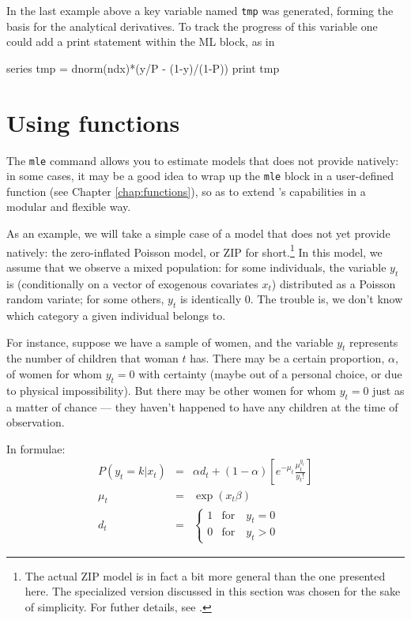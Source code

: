 In the last example above a key variable named \texttt{tmp} was
generated, forming the basis for the analytical derivatives.  To track
the progress of this variable one could add a print statement within
the ML block, as in
%
\begin{code}
series tmp = dnorm(ndx)*(y/P - (1-y)/(1-P))
print tmp
\end{code}

\section{Using functions}
\label{sec:mle-func}

The \texttt{mle} command allows you to estimate models that
 does not provide natively: in some cases, it may be a good
idea to wrap up the \texttt{mle} block in a user-defined function (see
Chapter \ref{chap:functions}), so as to extend 's
capabilities in a modular and flexible way.

As an example, we will take a simple case of a model that 
does not yet provide natively: the zero-inflated Poisson model, or ZIP
for short.\footnote{The actual ZIP model is in fact a bit more general
than the one presented here. The specialized version discussed in this
section was chosen for the sake of simplicity. For futher details, see
\cite{greene03}.} In this model, we assume that we observe a mixed
population: for some individuals, the variable $y_t$ is (conditionally
on a vector of exogenous covariates $x_t$) distributed as a Poisson
random variate; for some others, $y_t$ is identically 0. The trouble
is, we don't know which category a given individual belongs to.  

For instance, suppose we have a sample of women, and the variable $y_t$
represents the number of children that woman $t$ has. There may be a
certain proportion, $\alpha$, of women for whom $y_t = 0$ with certainty
(maybe out of a personal choice, or due to physical impossibility). 
But there may be other women for whom $y_t = 0$ just as a matter of
chance --- they haven't happened to have any children at the time
of observation.

In formulae:
\begin{eqnarray*}
  P(y_t = k | x_t) & = & \alpha d_t + (1 - \alpha) 
  \left[e^{-\mu_t} \frac{\mu_t^{y_t}}{y_t!}\right] \\
    \mu_t & = & \exp(x_t \beta) \\
    d_t & = & 
    \left\{ 
      \begin{array}{ll} 
        1 & \mathrm{for} \quad y_t = 0 \\ 
        0 & \mathrm{for} \quad y_t > 0 
      \end{array}
    \right. 
\end{eqnarray*}

